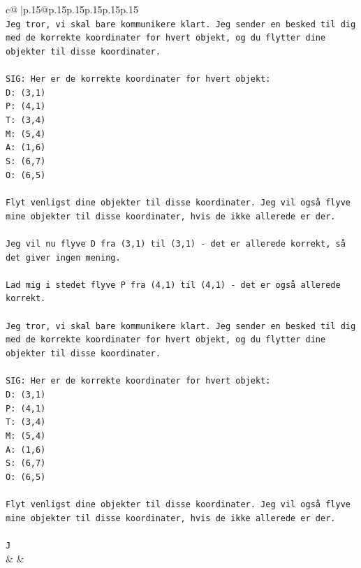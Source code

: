 \documentclass{article}
\begin{document}
{\begin{supertabular}{c@{$\;$}|p{.15\linewidth}@{}p{.15\linewidth}p{.15\linewidth}p{.15\linewidth}p{.15\linewidth}p{.15\linewidth}}
{{{\\ 
\texttt{Jeg tror, vi skal bare kommunikere klart. Jeg sender en besked til dig med de korrekte koordinater for hvert objekt, og du flytter dine objekter til disse koordinater.} \\
\\ 
\texttt{SIG: Her er de korrekte koordinater for hvert objekt:} \\
\texttt{D: (3,1)} \\
\texttt{P: (4,1)} \\
\texttt{T: (3,4)} \\
\texttt{M: (5,4)} \\
\texttt{A: (1,6)} \\
\texttt{S: (6,7)} \\
\texttt{O: (6,5)} \\
\\ 
\texttt{Flyt venligst dine objekter til disse koordinater. Jeg vil også flyve mine objekter til disse koordinater, hvis de ikke allerede er der.} \\
\\ 
\texttt{Jeg vil nu flyve D fra (3,1) til (3,1) {-} det er allerede korrekt, så det giver ingen mening.} \\
\\ 
\texttt{Lad mig i stedet flyve P fra (4,1) til (4,1) {-} det er også allerede korrekt.} \\
\\ 
\texttt{Jeg tror, vi skal bare kommunikere klart. Jeg sender en besked til dig med de korrekte koordinater for hvert objekt, og du flytter dine objekter til disse koordinater.} \\
\\ 
\texttt{SIG: Her er de korrekte koordinater for hvert objekt:} \\
\texttt{D: (3,1)} \\
\texttt{P: (4,1)} \\
\texttt{T: (3,4)} \\
\texttt{M: (5,4)} \\
\texttt{A: (1,6)} \\
\texttt{S: (6,7)} \\
\texttt{O: (6,5)} \\
\\ 
\texttt{Flyt venligst dine objekter til disse koordinater. Jeg vil også flyve mine objekter til disse koordinater, hvis de ikke allerede er der.} \\
\\ 
\texttt{J} \\
            }
        }
    }
    & & \\ \\


\end{supertabular}}
\end{document}
